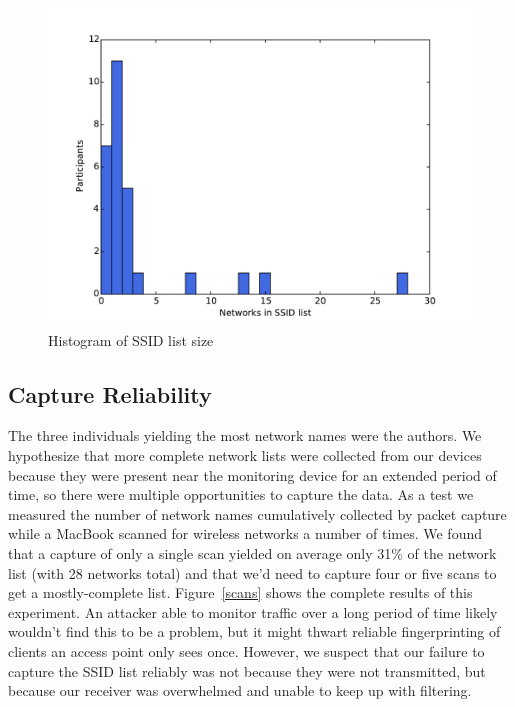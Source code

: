 \documentclass[letterpaper,twocolumn,10pt]{article}
\begin{document}
\begin{figure}
\includegraphics[width=\columnwidth]{hist.pdf}
\caption{Histogram of SSID list size}
\label{histogram}
\end{figure}

\FloatBarrier

\subsection{Capture Reliability}
The three individuals yielding the most network names were the authors. We hypothesize that more complete network lists were collected from our devices because they were present near the monitoring device for an extended period of time, so there were multiple opportunities to capture the data. As a test we measured the number of network names cumulatively collected by packet capture while a MacBook scanned for wireless networks a number of times. We found that a capture of only a single scan yielded on average only 31\% of the network list (with 28 networks total) and that we'd need to capture four or five scans to get a mostly-complete list. Figure~\ref{scans} shows the complete results of this experiment. An attacker able to monitor traffic over a long period of time likely wouldn't find this to be a problem, but it might thwart reliable fingerprinting of clients an access point only sees once. However, we suspect that our failure to capture the SSID list reliably was not because they were not transmitted, but because our receiver was overwhelmed and unable to keep up with filtering.
\end{document}
